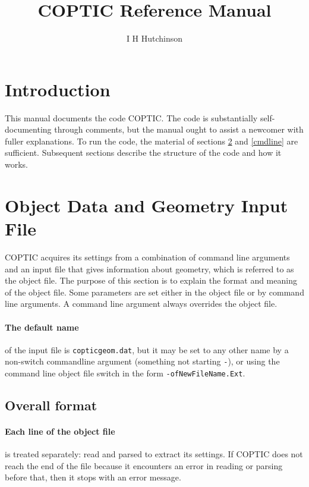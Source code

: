 \documentclass[12pt]{article}
\title{COPTIC Reference Manual}
\author{I H Hutchinson}
\begin{document}
\maketitle
\tableofcontents

\section{Introduction}

This manual documents the code COPTIC. The code is substantially
self-documenting through comments, but the manual ought to assist a
newcomer with fuller explanations. To run the code, the material of
sections \ref{infile} and \ref{cmdline} are sufficient. Subsequent
sections describe the structure of the code and how it works.

\section{Object Data and Geometry Input File}\label{infile}

COPTIC acquires its settings from a combination of command line
arguments and an input file that gives information about geometry,
which is referred to as the object file.  The purpose of this section
is to explain the format and meaning of the object file. Some
parameters are set either in the object file or by command line
arguments. A command line argument always overrides the object file.


\paragraph{The default name} of the input file is \verb!copticgeom.dat!, but it
may be set to any other name by a non-switch commandline argument
(something not starting \verb!-!), or using the command line object file
switch in the form \verb!-ofNewFileName.Ext!.

\subsection{Overall format}

\paragraph{Each line of the object file} is treated separately: read and parsed to
extract its settings. If COPTIC does not reach the end of the file
because it encounters an error in reading or parsing before that, then
it stops with an error message.
\end{document}
